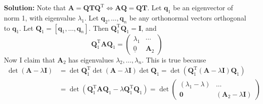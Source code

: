 \documentclass[14pt]{article}
\theoremstyle{definition}
\newenvironment{solution}
{\color{C2}\begin{framed}\begingroup\textbf{Solution:} }
  {\endgroup\end{framed}}
\theoremstyle{remark}
\begin{document}
\begin{solution}
    Note that $\boldsymbol{A}=\boldsymbol{Q} \boldsymbol{T} \boldsymbol{Q}^{\mathrm{T}} \Leftrightarrow \boldsymbol{A} \boldsymbol{Q}=\boldsymbol{Q} \boldsymbol{T}$. Let $\boldsymbol{q}_1$ be an eigenvector of norm 1, with eigenvalue $\lambda_1$. Let $\boldsymbol{q}_2, \ldots, \boldsymbol{q}_n$ be any orthonormal vectors orthogonal to $\boldsymbol{q}_1$. Let $\boldsymbol{Q}_1=\left[\boldsymbol{q}_1, \ldots, \boldsymbol{q}_n\right]$. Then $\boldsymbol{Q}_1^{\mathrm{T}} \boldsymbol{Q}_1=\boldsymbol{I}$, and
    $$
        \boldsymbol{Q}_1^{\mathrm{T}} \boldsymbol{A} \boldsymbol{Q}_1=\left(\begin{array}{cc}
                \lambda_1     & \cdots           \\
                \underline{0} & \boldsymbol{A}_2
            \end{array}\right)
    $$
    Now I claim that $\boldsymbol{A}_2$ has eigenvalues $\lambda_2, \ldots, \lambda_n$. This is true because
    $$
        \begin{aligned}
            \operatorname{\det}(\boldsymbol{A}-\lambda \boldsymbol{I}) & =\operatorname{\det} \boldsymbol{Q}_1^{\mathrm{T}} \operatorname{\det}(\boldsymbol{A}-\lambda \boldsymbol{I}) \operatorname{\det} \boldsymbol{Q}_1=\operatorname{\det}\left(\boldsymbol{Q}_1^{\mathrm{T}}(\boldsymbol{A}-\lambda \boldsymbol{I}) \boldsymbol{Q}_1\right) \\
                                                                       & =\operatorname{\det}\left(\boldsymbol{Q}_1^{\mathrm{T}} \boldsymbol{A} \boldsymbol{Q}_1-\lambda \boldsymbol{Q}_1^{\mathrm{T}} \boldsymbol{Q}_1\right)=\operatorname{\det}\left(\begin{array}{cc}
                                                                                                                                                                                                                                                                \left(\lambda_1-\lambda\right) & \ldots                                               \\
                                                                                                                                                                                                                                                                \mathbf{0}                     & \left(\boldsymbol{A}_2-\lambda \boldsymbol{I}\right)
                                                                                                                                                                                                                                                            \end{array}\right)     \\

\end{aligned}$$
\end{solution}
\end{document}

